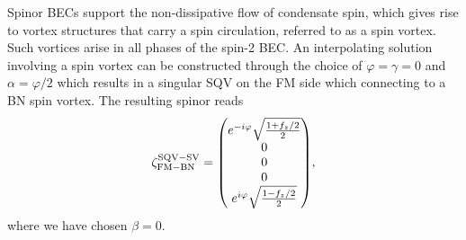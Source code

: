 Spinor BECs support the non-dissipative flow of condensate spin, which gives
rise to vortex structures that carry a spin circulation, referred to as a spin
vortex.
Such vortices arise in all phases of the spin-2 BEC\@.
An interpolating solution involving a spin vortex can be constructed through the
choice of \(\varphi=\gamma=0\) and \(\alpha=\varphi/2\) which results in a
singular SQV on the FM side which connecting to a BN spin vortex.
The resulting spinor reads
\begin{equation}
    \zeta_\mathrm{FM-BN}^\mathrm{SQV-SV} =
    \mqty(e^{-i\varphi}\sqrt{\frac{1 + f_z/2}{2}} \\ 0 \\ 0 \\ 0 \\
    e^{i\varphi}\sqrt{\frac{1 - f_z/2}{2}}),
\end{equation}
where we have chosen \(\beta = 0\).

